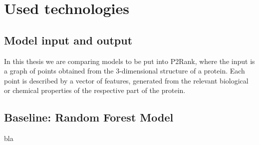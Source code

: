 \chapter{Used technologies}

\section{Model input and output}

In this thesis we are comparing models to be put into P2Rank, where the input is a graph of points obtained from the 3-dimensional structure of a protein. Each point is described by a vector of features, generated from the relevant biological or chemical properties of the respective part of the protein.

\section{Baseline: Random Forest Model}

bla